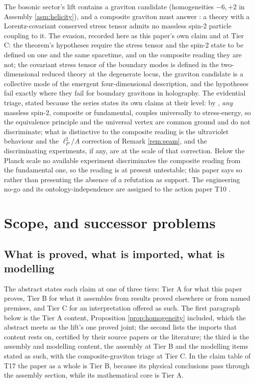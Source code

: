 \begin{remark}\label{rem:ww}
The bosonic sector's lift contains a graviton candidate (homogeneities $-6, +2$ in Assembly \ref{asm:helicity}), and a composite graviton must answer \cite{WeinbergWitten1980}: a theory with a Lorentz-covariant conserved stress tensor admits no massless spin-2 particle coupling to it. The evasion, recorded here as this paper's own claim and at Tier C: the theorem's hypotheses require the stress tensor and the spin-2 state to be defined on one and the same spacetime, and on the composite reading they are not; the covariant stress tensor of the boundary modes is defined in the two-dimensional reduced theory at the degenerate locus, the graviton candidate is a collective mode of the emergent four-dimensional description, and the hypotheses fail exactly where they fail for boundary gravitons in holography. The evidential triage, stated because the series states its own claims at their level: by \cite{Weinberg1964}, \emph{any} massless spin-2, composite or fundamental, couples universally to stress-energy, so the equivalence principle and the universal vertex are common ground and do not discriminate; what is distinctive to the composite reading is the ultraviolet behaviour and the $\ell_P^2/A$ correction of Remark \ref{rem:seam}, and the discriminating experiments, if any, are at the scale of that correction. Below the Planck scale no available experiment discriminates the composite reading from the fundamental one, so the reading is at present untestable; this paper says so rather than presenting the absence of a refutation as support. The engineering no-go and its ontology-independence are assigned to the action paper T10 \cite{ButlerT10}.
\end{remark}

\section{Scope, and successor problems}\label{sec:scope}

\subsection*{What is proved, what is imported, what is modelling}

The abstract states each claim at one of three tiers: Tier A for what this paper proves, Tier B for what it assembles from results proved elsewhere or from named premises, and Tier C for an interpretation offered as such. The first paragraph below is the Tier A content, Proposition \ref{prop:homogeneity} included, which the abstract meets as the lift's one proved joint; the second lists the imports that content rests on, certified by their source papers or the literature; the third is the assembly and modelling content, the assembly at Tier B and the modelling items stated as such, with the composite-graviton triage at Tier C. In the claim table of T17 \cite{ButlerT17} the paper as a whole is Tier B, because its physical conclusions pass through the assembly section, while its mathematical core is Tier A.

